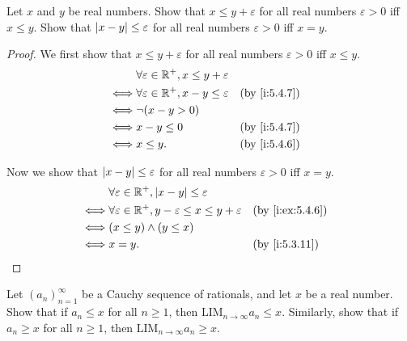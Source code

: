 \begin{ex}\label{i:ex:5.4.7}
  Let \(x\) and \(y\) be real numbers.
  Show that \(x \leq y + \varepsilon\) for all real numbers \(\varepsilon > 0\) iff \(x \leq y\).
  Show that \(\left\lvert x - y\right\rvert \leq \varepsilon\) for all real numbers \(\varepsilon > 0\) iff \(x = y\).
\end{ex}

\begin{proof}
  We first show that \(x \leq y + \varepsilon\) for all real numbers \(\varepsilon > 0\) iff \(x \leq y\).
  \begin{align*}
         & \forall \varepsilon \in \R^+, x \leq y + \varepsilon                   \\
    \iff & \forall \varepsilon \in \R^+, x - y \leq \varepsilon &  & \by{i:5.4.7} \\
    \iff & \lnot (x - y > 0)                                                      \\
    \iff & x - y \leq 0                                         &  & \by{i:5.4.7} \\
    \iff & x \leq y.                                            &  & \by{i:5.4.6}
  \end{align*}

  Now we show that \(\left\lvert x - y\right\rvert \leq \varepsilon\) for all real numbers \(\varepsilon > 0\) iff \(x = y\).
  \begin{align*}
         & \forall \varepsilon \in \R^+, \abs{x - y} \leq \varepsilon                                     \\
    \iff & \forall \varepsilon \in \R^+, y - \varepsilon \leq x \leq y + \varepsilon &  & \by{i:ex:5.4.6} \\
    \iff & (x \leq y) \land (y \leq x)                                                                    \\
    \iff & x = y.                                                                    &  & \by{i:5.3.11}
  \end{align*}
\end{proof}

\begin{ex}\label{i:ex:5.4.8}
  Let \((a_n)_{n = 1}^{\infty}\) be a Cauchy sequence of rationals, and let \(x\) be a real number.
  Show that if \(a_n \leq x\) for all \(n \geq 1\), then \(\text{LIM}_{n \to \infty} a_n \leq x\).
  Similarly, show that if \(a_n \geq x\) for all \(n \geq 1\), then \(\text{LIM}_{n \to \infty} a_n \geq x\).
\end{ex}

